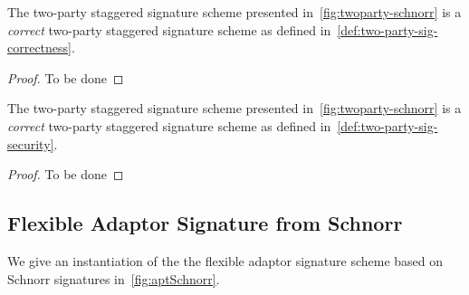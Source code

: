 \begin{theorem} The two-party staggered signature scheme presented in~\cref{fig:twoparty-schnorr} is a \emph{correct}  two-party staggered signature scheme as defined in~\cref{def:two-party-sig-correctness}. 
\end{theorem}

\begin{proof}
	To be done
\end{proof}


\begin{theorem} The two-party staggered signature scheme presented in~\cref{fig:twoparty-schnorr} is a \emph{correct}  two-party staggered signature scheme as defined in~\cref{def:two-party-sig-security}. 
\end{theorem}

\begin{proof}
	To be done
\end{proof}


\subsection{Flexible Adaptor Signature from Schnorr}
We give an instantiation of the the flexible adaptor signature scheme based on Schnorr signatures in~\cref{fig:aptSchnorr}.  




